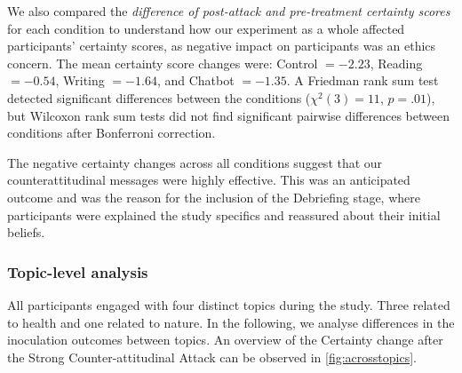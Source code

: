 \documentclass[sigconf]{acmart}
\begin{document}
We also compared the \textit{difference of post-attack and pre-treatment certainty scores} for each condition to understand how our experiment as a whole affected participants' certainty scores, as negative impact on participants was an ethics concern.
The mean certainty score changes were: Control $=-2.23$, Reading $=-0.54$, Writing $=-1.64$, and Chatbot $=-1.35$.
A Friedman rank sum test detected significant differences between the conditions ($\chi^2(3)=11$, $p=.01$), but Wilcoxon rank sum tests did not find significant pairwise differences between conditions after Bonferroni correction.

The negative certainty changes across all conditions suggest that our counterattitudinal messages were highly effective. 
This was an anticipated outcome and was the reason for the inclusion of the Debriefing stage, where participants were explained the study specifics and reassured about their initial beliefs. 


\subsubsection{Topic-level analysis}
\label{sec:topic_differences}

All participants engaged with four distinct topics during the study.
Three related to health and one related to nature.
In the following, we analyse differences in the inoculation outcomes between topics. An overview of the Certainty change after the Strong Counter-attitudinal Attack can be observed in \autoref{fig:acrosstopics}.
\end{document}
